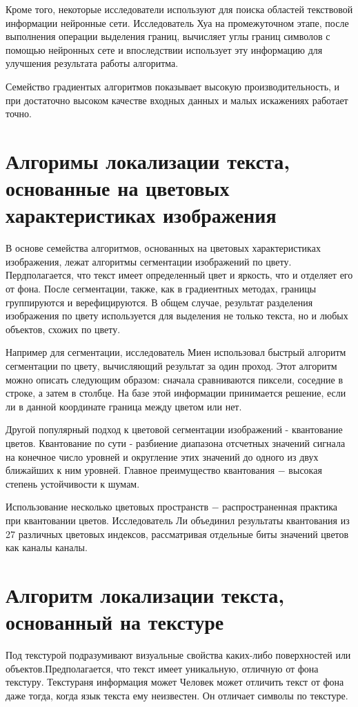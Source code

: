 \documentclass[oneside,final,14pt]{extreport}
\begin{document}
Кроме того, некоторые исследователи используют для поиска областей текствовой информации нейронные сети. Исследователь Хуа на промежуточном этапе, после выполнения операции выделения границ,  вычисляет углы границ символов с помощью нейронных сете и впоследствии использует эту информацию для улучшения результата работы алгоритма. 

Семейство градиентых алгоритмов показывает высокую производительность, и при достаточно высоком качестве входных данных и малых искажениях работает точно.

\section{Алгоримы локализации текста, основанные на цветовых характеристиках изображения}

В основе семейства алгоритмов, основанных на цветовых характеристиках изображения, лежат алгоритмы сегментации изображений по цвету. Пердполагается, что текст имеет определенный цвет и яркость, что и отделяет его от фона.  После сегментации, также, как в градиентных методах, границы группируются и верефицируются. В общем случае, результат разделения изображения по цвету используется для выделения не только текста, но и любых объектов, схожих по цвету.

Например для сегментации, исследователь Миен использовал быстрый алгоритм сегментации по цвету, вычисляющий результат за один проход. Этот алгоритм можно описать следующим образом: сначала сравниваются пиксели, соседние в строке, а затем в столбце. На базе этой информации принимается решение, если ли в данной координате граница между цветом или нет.    

Другой популярный подход к цветовой сегментации изображений - квантование цветов. Квантование по сути - разбиение диапазона отсчетных значений сигнала на конечное число уровней и округление этих значений до одного из двух ближайших к ним уровней. Главное преимущество квантования $-$ высокая степень устойчивости к шумам. 

Использование несколько цветовых пространств $-$ распространенная практика при квантовании цветов. Исследователь Ли объединил результаты квантования из 27 различных цветовых индексов, рассматривая  отдельные биты значений цветов как каналы каналы. 

\section{Алгоритм локализации текста, основанный на текстуре}
Под текстурой подразумивают визуальные свойства каких-либо поверхностей или объектов.Предполагается, что текст имеет уникальную, отличную от фона текстуру. Текстураня информация может  Человек может отличить текст от фона даже тогда, когда язык текста ему неизвестен. Он отличает символы по текстуре. 
\end{document}
